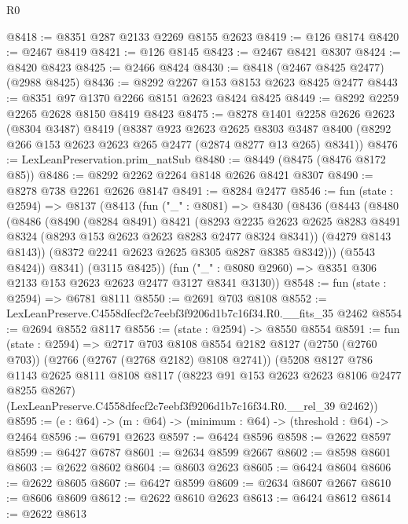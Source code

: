 \begin{lexlean}{R0}
\begin{coremodule}
@8418 := @8351 @287 @2133 @2269 @8155 @2623
@8419 := @126 @8174
@8420 := @2467 @8419
@8421 := @126 @8145
@8423 := @2467 @8421 @8307
@8424 := @8420 @8423
@8425 := @2466 @8424
@8430 := @8418 (@2467 @8425 @2477) (@2988 @8425)
@8436 := @8292 @2267 @153 @8153 @2623 @8425 @2477
@8443 := @8351 @97 @1370 @2266 @8151 @2623 @8424 @8425
@8449 := @8292 @2259 @2265 @2628 @8150 @8419 @8423
@8475 := @8278
    @1401
    @2258
    @2626
    @2623
    (@8304 @3487)
    @8419
    (@8387
      @923
      @2623
      @2625
      @8303
      @3487
      @8400
      (@8292 @266 @153 @2623 @2623 @265 @2477 (@2874 @8277 @13 @265) @8341))
@8476 := LexLeanPreservation.prim_natSub
@8480 := @8449 (@8475 (@8476 @8172 @85))
@8486 := @8292 @2262 @2264 @8148 @2626 @8421 @8307
@8490 := @8278 @738 @2261 @2626 @8147
@8491 := @8284 @2477
@8546 := fun (state : @2594) =>
  @8137
    (@8413
      (fun ("_" : @8081) =>
      @8430
        (@8436
          (@8443
            (@8480
              (@8486
                (@8490
                  (@8284 @8491)
                  @8421
                  (@8293
                    @2235
                    @2623
                    @2625
                    @8283
                    @8491
                    @8324
                    (@8293 @153 @2623 @2623 @8283 @2477 @8324 @8341))
                  (@4279 @8143 @8143))
                (@8372 @2241 @2623 @2625 @8305 @8287 @8385 @8342)))
            (@5543 @8424))
          @8341)
        (@3115 @8425))
      (fun ("_" : @8080 @2960) => @8351 @306 @2133 @153 @2623 @2623 @2477 @3127 @8341 @3130))
@8548 := fun (state : @2594) => @6781 @8111
@8550 := @2691 @703 @8108
@8552 := LexLeanPreserve.C4558dfecf2c7eebf3f9206d1b7c16f34.R0.__fits_35 @2462
@8554 := @2694 @8552 @8117
@8556 := (state : @2594) -> @8550 @8554
@8591 := fun (state : @2594) =>
  @2717
    @703
    @8108
    @8554
    @2182
    @8127
    (@2750 (@2760 @703))
    (@2766 (@2767 (@2768 @2182) @8108 @2741))
    (@5208
      @8127
      @786
      @1143
      @2625
      @8111
      @8108
      @8117
      (@8223 @91 @153 @2623 @2623 @8106 @2477 @8255 @8267)
      (LexLeanPreserve.C4558dfecf2c7eebf3f9206d1b7c16f34.R0.__rel_39 @2462))
@8595 := (e : @64) -> (m : @64) -> (minimum : @64) -> (threshold : @64) -> @2464
@8596 := @6791 @2623
@8597 := @6424 @8596
@8598 := @2622 @8597
@8599 := @6427 @6787
@8601 := @2634 @8599 @2667
@8602 := @8598 @8601
@8603 := @2622 @8602
@8604 := @8603 @2623
@8605 := @6424 @8604
@8606 := @2622 @8605
@8607 := @6427 @8599
@8609 := @2634 @8607 @2667
@8610 := @8606 @8609
@8612 := @2622 @8610 @2623
@8613 := @6424 @8612
@8614 := @2622 @8613

\end{coremodule}
\end{lexlean}
